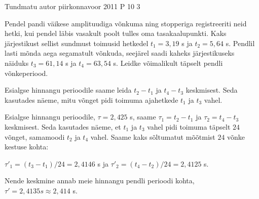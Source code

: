 {Tundmatu autor} %
{piirkonnavoor} %
{2011} %
{P 10} %
{3} %
{

\ifStatement
Pendel pandi väikese amplituudiga võnkuma ning stopperiga registreeriti neid hetki, kui pendel läbis vasakult poolt tulles oma tasakaalupunkti. Kaks järjestikust sellist sundmust toimusid hetkedel  $t_1 = 3,19$ s ja $t_2 =  5,64$ s. Pendlil lasti mõnda aega segamatult võnkuda, seejärel saadi kaheks järjestikuseks näiduks $t_3 =  61,14$ s ja $t_4 =  63,54$ s. Leidke võimalikult täpselt pendli võnkeperiood.
\fi

\ifHint
Esialgse hinnangu perioodile saame leida $t_2 - t_1$ ja $t_4 - t_3$ keskmisest. Seda kasutades näeme, mitu võnget pidi toimuma ajahetkede $t_1$ ja $t_3$ vahel.
\fi

\ifSolution
Esialgse hinnangu perioodile, $\tau = 2,425$ s, saame $\tau _1 = t_2 - t_1$ ja $\tau _2 = t_4 - t_3$ keskmisest. Seda kasutades näeme, et $t_1$ ja $t_3$ vahel pidi toimuma täpselt $24$ võnget, samamoodi $t_2$ ja $t_4$ vahel. Saame kaks sõltumatut mõõtmist $24$ võnke kestuse kohta:
\begin{center}
$\tau'_1  = (t_3 - t_1)/24 = 2,4146$ s ja $\tau'_2  = (t_4-t_2)/24 =  2,4125$ s.
\end{center}
Nende keskmine annab meie hinnangu pendli perioodi kohta, $\tau' = 2,4135 s \approx 2,414$ s.
\fi
}